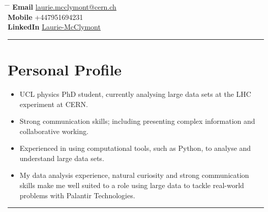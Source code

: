 \documentclass[10pt]{article} %
\begin{document}


\parbox{0.5\textwidth}{ %
\title{} %
}
\hspace{2cm} %
\parbox{0.5\textwidth}{ %
  \begin{tabbing} %
    \hspace{2cm} \= \hspace{3cm} \= \kill %
           {\bf Email} \> \href{mailto:laurie.mcclymont@cern.ch}{laurie.mcclymont@cern.ch} \\ %
           {\bf Mobile} \> +447951694231  \\ %
           {\bf LinkedIn} \> \href{https://www.linkedin.com/in/laurie-mcclymont-695520118/}{Laurie-McClymont} %
  \end{tabbing}
}

\rule{\textwidth}{0.5mm}


\vspace{-2mm}
\section{Personal Profile}
\begin{itemize}
\item{UCL physics PhD student, currently analysing large data sets at the LHC experiment at CERN.}
\item{Strong communication skills; including presenting complex information and collaborative working.}
\item{Experienced in using computational tools, such as Python, to analyse and understand large data sets.}
\item{My data analysis experience, natural curiosity and strong communication skills make me well
      suited to a role using large data to tackle real-world problems with Palantir Technologies.}
\end{itemize}

\vspace{0.2mm}
\rule{\textwidth}{0.5mm}
\end{document}
